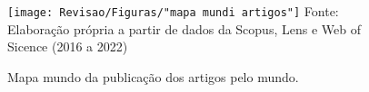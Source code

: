 \begin{figure}[H]
	\centering
	\caption{Mapa mundo da publicação dos artigos pelo mundo.}
	\label{fig:mapa-mundi-artigos}
	\texttt{[image: Revisao/Figuras/"mapa mundi artigos"]}
	\vspace{0.2cm}
	Fonte: Elaboração própria a partir de dados da Scopus, Lens e Web of Sicence (2016 a 2022)
\end{figure}